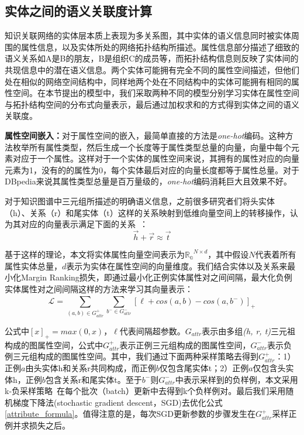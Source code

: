 \subsection{实体之间的语义关联度计算}
知识关联网络的实体层本质上表现为多关系图，其中实体的语义信息同时被实体周围的属性信息，以及实体所处的网络拓扑结构所描述。属性信息部分描述了细致的语义关系如A是B的朋友，B是组织C的成员等，而拓扑结构信息则反映了实体间的共现信息中的潜在语义信息。两个实体可能拥有完全不同的属性空间描述，但他们处在相似的网络空间结构中，同样地两个处在不同结构中的实体可能拥有相同的属性空间。在本节提出的模型中，我们采取两种不同的模型分别学习实体在属性空间与拓扑结构空间的分布式向量表示，最后通过加权求和的方式得到实体之间的语义关联度。

\textbf{属性空间嵌入：}对于属性空间的嵌入，最简单直接的方法是\emph{one-hot}编码。这种方法枚举所有属性类型，然后生成一个长度等于属性类型总量的向量，向量中每个元素对应于一个属性。这样对于一个实体的属性空间来说，其拥有的属性对应的向量元素为1，没有的的属性为0，每个实体最后对应的向量长度都等于属性总量。对于DBpedia来说其属性类型总量是百万量级的，\emph{one-hot}编码消耗巨大且效果不好。

对于知识图谱中三元组所描述的明确语义信息，之前很多研究者们将头实体（h）、关系（r）和尾实体（t）这样的关系映射到低维向量空间上的转移操作，认为其对应的向量表示满足下面的关系~\cite{nips/BordesUGWY13, aaai/WuFCABW18}：
\begin{equation}
    \label{hrt}
    \vec h + \vec r \approx \vec t
\end{equation}

\noindent 基于这样的理论，本文将实体属性向量空间表示为$\mathbb{R_a} ^ {N \times d}$，其中假设$N$代表着所有属性实体总量，$d$表示为实体在属性空间的向量维度。我们结合实体以及关系来最小化Margin Ranking损失，即通过最小化正例实体属性对之间间隔，最大化负例实体属性对之间间隔这样的方法来学习其向量表示：
\begin{equation}
    \label{attribute_formula}
    \mathcal{L} = \sum_{(a,b) \in G_{attr}^+}^{ } \sum_{b^- \in G_{attr}^-}^{ }[\ell + cos(a,b)-cos(a,b^-)]_+
\end{equation}

\noindent 公式中$[x]_+=max(0, x)$，$\ell$代表间隔超参数。$G_{attr}$表示由多组\emph{(h, r, t)}三元祖构成的图属性空间，公式中$G_{attr}^+$表示正例三元组构成的图属性空间，$G_{attr}^-$表示负例三元组构成的图属性空间。其中，我们通过下面两种采样策略去得到$G_{attr}^+$：1）正例$a$由头实体h和关系r共同构成，而正例$b$仅包含尾实体t；2）正例$a$仅包含头实体h，正例$b$包含关系r和尾实体t。至于$b^-$则$G_{attr}^-$中表示采样到的负样例，本文采用k-负采样策略~\cite{corr/Mikolov13}在每个批次（batch）更新中去得到k个负样例对。最后我们采用随机梯度下降法(stochastic gradient descent，SGD)去优化公式\ref{attribute_formula}。值得注意的是，每次SGD更新参数的步骤发生在$G_{attr}^+$采样正例并求损失之后。

